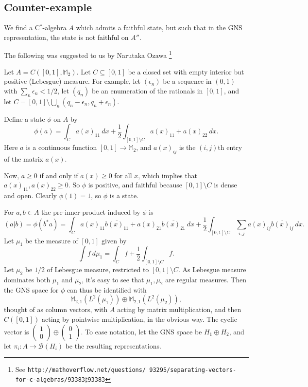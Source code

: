 \documentclass[twoside,a4paper,12pt]{article}
\theoremstyle{plain}
\theoremstyle{definition}
\newcommand{\mc}{\mathcal}
\begin{document}
\subsection{Counter-example}

We find a C$^*$-algebra $A$ which admits a faithful state, but such that in
the GNS representation, the state is not faithful on $A''$.

The following was suggested to us by Narutaka Ozawa%
\footnote{See \texttt{http://mathoverflow.net/questions/%
93295/separating-vectors-for-c-algebras/93383$\sharp$93383}}

Let $A=C([0,1],\mathbb M_2)$.  Let $C\subseteq [0,1]$ be a closed set with empty
interior but positive (Lebesgue) measure.  For example, let $(\epsilon_n)$
be a sequence in $(0,1)$ with $\sum_n \epsilon_n<1/2$, let $(q_n)$ be an
enumeration of the rationals in $[0,1]$, and let
$C=[0,1]\setminus\bigcup_n (q_n-\epsilon_n,q_n+\epsilon_n)$.

Define a state $\phi$ on $A$ by
\[ \phi(a) = \int_C a(x)_{11} \ dx +
\frac12\int_{[0,1]\setminus C} a(x)_{11}+a(x)_{22} \ dx. \]
Here $a$ is a continuous function $[0,1]\rightarrow\mathbb M_2$, and
$a(x)_{ij}$ is the $(i,j)$th entry of the matrix $a(x)$.

Now, $a\geq 0$ if and only if $a(x)\geq 0$ for all $x$, which implies that
$a(x)_{11}, a(x)_{22}\geq 0$.  So $\phi$ is positive, and faithful because
$[0,1]\setminus C$ is dense and open.
Clearly $\phi(1)=1$, so $\phi$ is a state.  

For $a,b\in A$ the pre-inner-product induced by $\phi$ is
\[ (a|b) = \phi(b^*a) = \int_C a(x)_{11}\overline{b(x)_{11}} +
a(x)_{21} \overline{ b(x)_{21} } \ dx +
\frac12\int_{[0,1]\setminus C} \sum_{i,j} a(x)_{ij}\overline{b(x)_{ij}} \ dx. \]
Let $\mu_1$ be the measure of $[0,1]$ given by
\[ \int f \ d\mu_1 = \int_C f + \frac12 \int_{[0,1]\setminus C} f. \]
Let $\mu_2$ be $1/2$ of Lebesgue measure, restricted to $[0,1]\setminus C$.
As Lebesgue measure dominates both $\mu_1$ and $\mu_2$, it's easy to see that
$\mu_1,\mu_2$ are regular measures.
Then the GNS space for $\phi$ can thus be identified with
\[ \mathbb M_{2,1}(L^2(\mu_1)) \oplus \mathbb M_{2,1}(L^2(\mu_2)), \]
thought of as column vectors, with $A$ acting by matrix multiplication,
and then $C([0,1])$ acting by pointwise multiplication, in the obvious way.
The cyclic vector is $\begin{pmatrix} 1 \\ 0 \end{pmatrix} \oplus
\begin{pmatrix} 0 \\ 1 \end{pmatrix}$.  To ease notation, let the GNS space
be $H_1\oplus H_2$, and let $\pi_i:A\rightarrow\mc B(H_i)$ be the resulting
representations.
\end{document}
